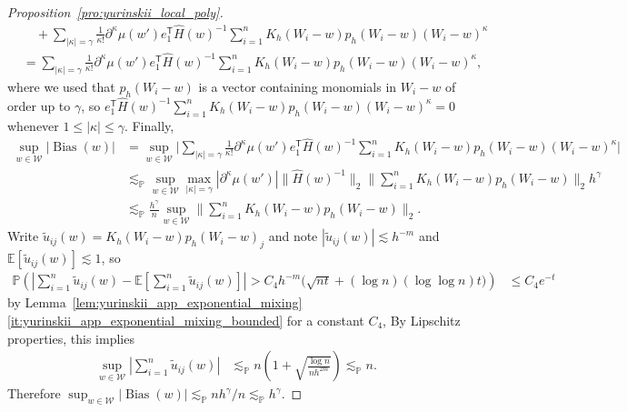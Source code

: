 \documentclass[11pt,lof]{puthesis}
\renewcommand{\P}{\ensuremath{\mathbb{P}}}
\newcommand{\E}{\ensuremath{\mathbb{E}}}
\newcommand{\cW}{\ensuremath{\mathcal{W}}}
\newcommand{\T}{\ensuremath{\mathsf{T}}}
\DeclareMathOperator{\Bias}{Bias}
\theoremstyle{break}
\theoremstyle{proof}
\newtheorem{proof}{Proof}
\begin{document}
\begin{proof}[Proposition~\ref{pro:yurinskii_local_poly}]
\begin{align*}
    &\quad+
    \sum_{|\kappa|=\gamma}
    \frac{1}{\kappa!}
    \partial^{\kappa} \mu(w')
    e_1^\T \hat H(w)^{-1}
    \sum_{i=1}^n K_h(W_i-w) p_h(W_i-w)
    (W_i-w)^\kappa \\
    &=
    \sum_{|\kappa|=\gamma}
    \frac{1}{\kappa!}
    \partial^{\kappa} \mu(w')
    e_1^\T \hat H(w)^{-1}
    \sum_{i=1}^n K_h(W_i-w) p_h(W_i-w)
    (W_i-w)^\kappa,
  \end{align*}
  where we used that
  $p_h(W_i-w)$ is a vector containing monomials
  in $W_i-w$ of order up to $\gamma$, so
  $e_1^\T \hat H(w)^{-1}
  \sum_{i=1}^n K_h(W_i-w) p_h(W_i-w)
  (W_i-w)^\kappa = 0$
  whenever $1 \leq |\kappa| \leq \gamma$.
  Finally,
  \begin{align*}
    \sup_{w\in\cW}
    |\Bias(w)|
    &=
    \sup_{w\in\cW}
    \Bigg|
    \sum_{|\kappa|=\gamma}
    \frac{1}{\kappa!}
    \partial^{\kappa} \mu(w')
    e_1^\T \hat H(w)^{-1}
    \sum_{i=1}^n K_h(W_i-w) p_h(W_i-w)
    (W_i-w)^\kappa
    \Bigg| \\
    &\lesssim_\P
    \sup_{w\in\cW}
    \max_{|\kappa| = \gamma}
    \left|
    \partial^{\kappa} \mu(w')
    \right|
    \|\hat H(w)^{-1}\|_2
    \Bigg\|
    \sum_{i=1}^n K_h(W_i-w) p_h(W_i-w)
    \Bigg\|_2
    h^\gamma \\
    &\lesssim_\P
    \frac{h^\gamma}{n}
    \sup_{w\in\cW}
    \Bigg\|
    \sum_{i=1}^n K_h(W_i-w) p_h(W_i-w)
    \Bigg\|_2.
  \end{align*}
  Write $\tilde u_{i j}(w) = K_h(W_i-w)p_h(W_i-w)_j$ and note $|\tilde u_{i
  j}(w)| \lesssim h^{-m}$ and $\E[\tilde u_{i j}(w)] \lesssim 1$, so
  \begin{align*}
    \P\left(
      \left|
      \sum_{i=1}^n \tilde u_{i j}(w)
      - \E\left[
        \sum_{i=1}^n \tilde u_{i j}(w)
      \right]
      \right|
      > C_4 h^{-m} \big( \sqrt{n t}
      + (\log n)(\log \log n) t \big)
    \right)
    &\leq
    C_4 e^{-t}
  \end{align*}
  by Lemma~\ref{lem:yurinskii_app_exponential_mixing}%
  \ref{it:yurinskii_app_exponential_mixing_bounded} for a constant $C_4$,
  By Lipschitz properties, this implies
  \begin{align*}
    \sup_{w \in \cW}
    \left|
    \sum_{i=1}^n \tilde u_{i j}(w)
    \right|
    &\lesssim_\P
    n
    \left(
      1 + \sqrt{\frac{\log n}{n h^{2m}}}
    \right)
    \lesssim_\P
    n.
  \end{align*}
  Therefore $\sup_{w\in\cW} |\Bias(w)|
  \lesssim_\P n h^\gamma / n
  \lesssim_\P h^\gamma$.


\end{proof}
\end{document}
